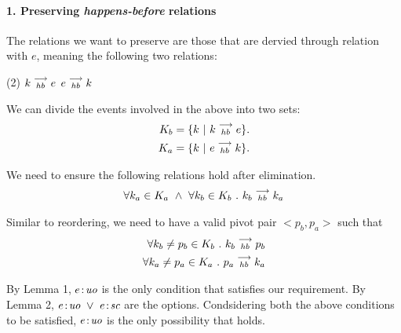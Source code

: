\paragraph{1. Preserving \emph{happens-before} relations}
        The relations we want to preserve are those that are dervied through relation with $e$, meaning the following two relations:
        \begin{tasks}(2)
            \task $k\stackrel{\longrightarrow}{_{hb}}e$
            \task $e\stackrel{\longrightarrow}{_{hb}}k$
        \end{tasks}

        We can divide the events involved in the above into two sets:
        \begin{align*}
            K_b = \{k \ | \ k\stackrel{\longrightarrow}{_{hb}}e \}. \\
            K_a = \{k \ | \ e\stackrel{\longrightarrow}{_{hb}}k \}. 
        \end{align*}


        We need to ensure the following relations hold after elimination.
        \begin{align}
            \forall k_a \in K_a \ \wedge \ \forall k_b \in K_b \ . \ \reln{k_b}{hb}{k_a}
        \end{align}


        Similar to reordering, we need to have a valid pivot pair $<p_b, p_a>$ such that 
        \begin{align}
            \forall k_b \neq p_b \in K_b \ . \ k_b\stackrel{\longrightarrow}{_{hb}}p_b \\
            \forall k_a \neq p_a \in K_a \ . \ p_a\stackrel{\longrightarrow}{_{hb}}k_a 
        \end{align}

        By Lemma 1, $e\!:\!\textit{uo}$ is the only condition that satisfies our requirement. By Lemma 2, $e\!:\!\textit{uo} \ \vee \ e\!:\!\textit{sc}$ are the options. Condsidering both the above conditions to be satisfied, $e\!:\!\textit{uo}$ is the only possibility that holds. 

